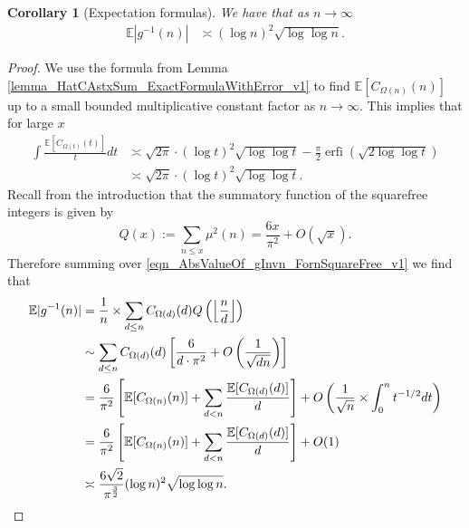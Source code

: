 \documentclass[11pt,reqno,a4letter]{article}
\numberwithin{figure}{section}
\numberwithin{table}{section}
\newcommand{\Floor}[2]{\ensuremath{\left\lfloor \frac{#1}{#2} \right\rfloor}}
\theoremstyle{plain}
\newtheorem{cor}[theorem]{Corollary}
\numberwithin{theorem}{section}
\theoremstyle{definition}
\begin{document}
\begin{cor}[Expectation formulas] 
\label{cor_ExpectationFormulaAbsgInvn_v2} 
We have that as $n \rightarrow \infty$ 
\begin{align*} 
\mathbb{E}|g^{-1}(n)| & \asymp (\log n)^2 \sqrt{\log\log n}. 
\end{align*} 
\end{cor} 
\begin{proof} 
We use the formula from Lemma \ref{lemma_HatCAstxSum_ExactFormulaWithError_v1} 
to find $\mathbb{E}[C_{\Omega(n)}(n)]$ up to a small bounded multiplicative 
constant factor as $n \rightarrow \infty$.
This implies that for large $x$ 
\begin{align*} 
\int \frac{\mathbb{E}[C_{\Omega(t)}(t)]}{t} dt & \asymp 
     \sqrt{2\pi} \cdot (\log t)^2 \sqrt{\log\log t} - 
     \frac{\pi}{2} \operatorname{erfi}\left(\sqrt{2\log\log t}\right) \\ 
     & \asymp \sqrt{2\pi} \cdot (\log t)^2 \sqrt{\log\log t}. 
\end{align*} 
Recall from the introduction that the summatory function of the 
squarefree integers is given by 
\[
Q(x) := \sum_{n \leq x} \mu^2(n) = \frac{6x}{\pi^2} + O(\sqrt{x}). 
\]
Therefore summing over \eqref{eqn_AbsValueOf_gInvn_FornSquareFree_v1} 
we find that  
\begin{align} 
\notag 
\mathbb{E}|g^{-1}(n)| & = \frac{1}{n} \times \sum_{d \leq n} 
     C_{\Omega(d)}(d) Q\left(\Floor{n}{d}\right) \\ 
\notag 
     & \sim \sum_{d \leq n} C_{\Omega(d)}(d) \left[\frac{6}{d \cdot \pi^2} + O\left(\frac{1}{\sqrt{dn}}\right) 
     \right] \\ 
\notag 
     & = \frac{6}{\pi^2} \left[\mathbb{E}[C_{\Omega(n)}(n)] + \sum_{d<n} 
     \frac{\mathbb{E}[C_{\Omega(d)}(d)]}{d}\right] + 
     O\left(\frac{1}{\sqrt{n}} \times \int_0^{n} t^{-1/2} dt\right) \\ 
\label{eqn_proof_tag_ExpAbsgInvn_ExpandedByExpsOfCkn_v1} 
     & = \frac{6}{\pi^2}\left[\mathbb{E}[C_{\Omega(n)}(n)] + 
     \sum_{d<n} \frac{\mathbb{E}[C_{\Omega(d)}(d)]}{d}\right] + O(1) \\ 
\notag 
     & \asymp \frac{6 \sqrt{2}}{\pi^{\frac{3}{2}}} (\log n)^2 \sqrt{\log\log n}. 
     \qedhere 
\end{align} 
\end{proof} 
\end{document}
